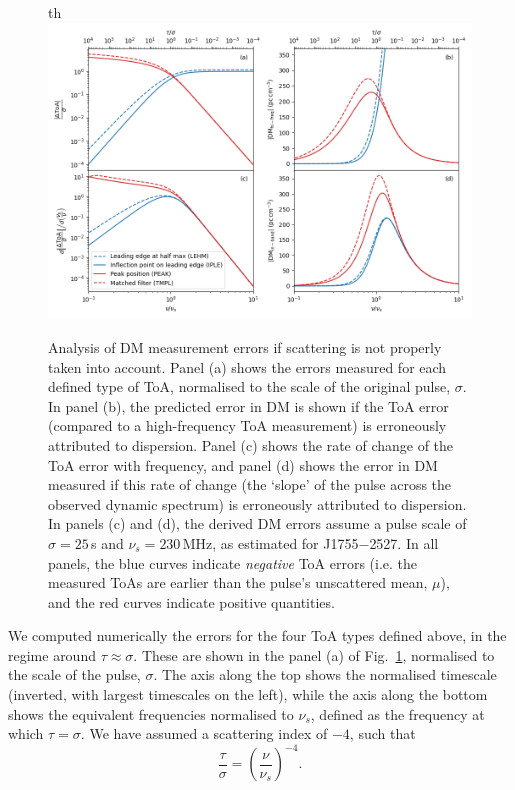 \documentclass[fleqn,usenatbib]{mnras}
\newcommand{\src}{J1755$-$2527}
\newcommand{\Fig}{Fig.}
\begin{document}
\begin{figure}{th}
    \centering
    \includegraphics[width=0.98\linewidth]{scattering_DM.png}
    \caption{Analysis of DM measurement errors if scattering is not properly taken into account. Panel (a) shows the errors measured for each defined type of ToA, normalised to the scale of the original pulse, $\sigma$. In panel (b), the predicted error in DM is shown if the ToA error (compared to a high-frequency ToA measurement) is erroneously attributed to dispersion. Panel (c) shows the rate of change of the ToA error with frequency, and panel (d) shows the error in DM measured if this rate of change (the `slope' of the pulse across the observed dynamic spectrum) is erroneously attributed to dispersion. In panels (c) and (d), the derived DM errors assume a pulse scale of $\sigma = 25\,$s and $\nu_s = 230\,$MHz, as estimated for \src{}. In all panels, the blue curves indicate \emph{negative} ToA errors (i.e. the measured ToAs are earlier than the pulse's unscattered mean, $\mu$), and the red curves indicate positive quantities.}
    \label{fig:scattering_DM}
\end{figure}

We computed numerically \citep[using SciPy's \texttt{root} function;][]{2020NatMe..17..261V} the errors for the four ToA types defined above, in the regime around $\tau \approx \sigma$.
These are shown in the panel (a) of \Fig~\ref{fig:scattering_DM}, normalised to the scale of the pulse, $\sigma$.
The axis along the top shows the normalised timescale (inverted, with largest timescales on the left), while the axis along the bottom shows the equivalent frequencies normalised to $\nu_s$, defined as the frequency at which $\tau = \sigma$.
We have assumed a scattering index of $-4$, such that
\begin{equation}
    \frac{\tau}{\sigma} = \left(\frac{\nu}{\nu_s}\right)^{-4}.
\end{equation}
\end{document}
